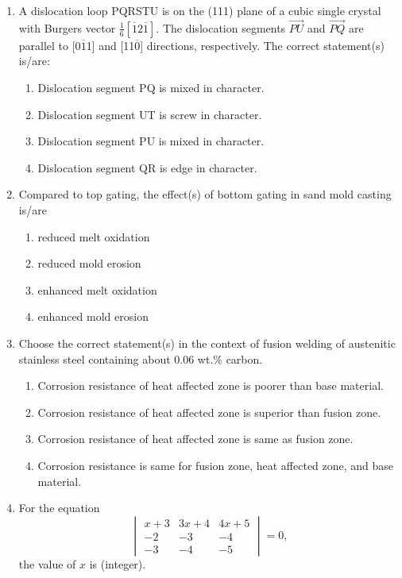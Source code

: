 \documentclass[12pt]{article}
\begin{document}
\begin{enumerate}
\item A dislocation loop PQRSTU is on the (111) plane of a cubic single crystal with Burgers vector \(\frac{1}{6}[ \overline{1} 2 \overline{1}]\). The dislocation segments \(\overrightarrow{PU}\) and \(\overrightarrow{PQ}\) are parallel to [0\(\overline{1}\)1] and [11\(\overline{0}\)] directions, respectively. The correct statement(s) is/are:
\begin{enumerate}[label=(\alph*)]
\item Dislocation segment PQ is mixed in character.
\item Dislocation segment UT is screw in character.
\item Dislocation segment PU is mixed in character.
\item Dislocation segment QR is edge in character.
\end{enumerate}

\item Compared to top gating, the effect(s) of bottom gating in sand mold casting is/are  
\begin{enumerate}[label=(\alph*)]
\item reduced melt oxidation
\item reduced mold erosion
\item enhanced melt oxidation
\item enhanced mold erosion
\end{enumerate}

\item Choose the correct statement(s) in the context of fusion welding of austenitic stainless steel containing about 0.06 wt.\% carbon.  
\begin{enumerate}[label=(\alph*)]
\item Corrosion resistance of heat affected zone is poorer than base material.
\item Corrosion resistance of heat affected zone is superior than fusion zone.
\item Corrosion resistance of heat affected zone is same as fusion zone.
\item Corrosion resistance is same for fusion zone, heat affected zone, and base material.
\end{enumerate}

\item For the equation  
\[
\begin{vmatrix}
x+3 & 3x+4 & 4x+5 \\
-2 & -3 & -4 \\
-3 & -4 & -5
\end{vmatrix} = 0,
\]
the value of \(x\) is \underline{\hspace{2cm}} (integer).


\end{enumerate}
\end{document}
